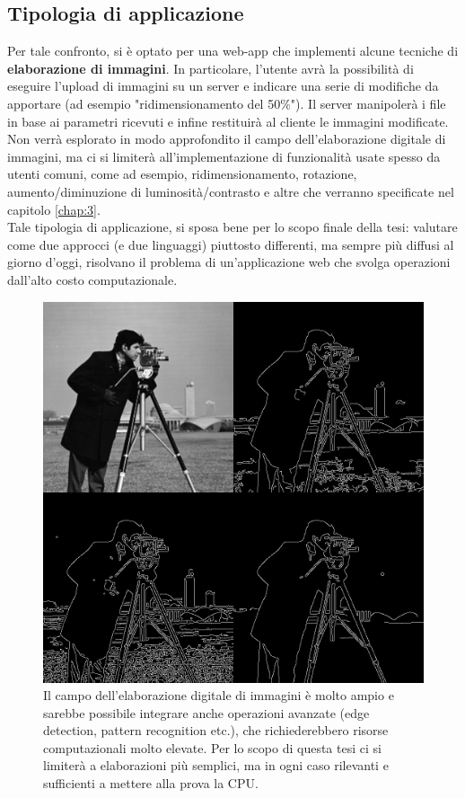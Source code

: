 \subsection{Tipologia di applicazione}
Per tale confronto, si è optato per una web-app che implementi alcune tecniche di \textbf{elaborazione di immagini}.
In particolare, l'utente avrà la possibilità di eseguire l'upload di immagini su un server e indicare una serie di modifiche da apportare (ad esempio "ridimensionamento del 50\%"). Il server manipolerà i file in base ai parametri ricevuti e infine restituirà al cliente le immagini modificate.
\\Non verrà esplorato in modo approfondito il campo dell'elaborazione digitale di immagini, ma ci si limiterà all'implementazione di funzionalità usate spesso da utenti comuni, come ad esempio, ridimensionamento, rotazione, aumento/diminuzione di luminosità/contrasto e altre che verranno specificate nel capitolo \ref{chap:3}.
\\Tale tipologia di applicazione, si sposa bene per lo scopo finale della tesi: valutare come due approcci (e due linguaggi) piuttosto differenti, ma sempre più diffusi al giorno d'oggi, risolvano il problema di un'applicazione web che svolga operazioni dall'alto costo computazionale.
\begin{figure}
        \begin{center}
                \includegraphics[width=0.55\columnwidth]{images/imageProc.jpg}
        \end{center}
        \caption[Image Processing]{Il campo dell'elaborazione digitale di immagini è molto ampio e sarebbe possibile integrare anche operazioni avanzate (edge detection, pattern recognition etc.), che richiederebbero risorse computazionali molto elevate. Per lo scopo di questa tesi ci si limiterà a elaborazioni più semplici, ma in ogni caso rilevanti e sufficienti a mettere alla prova la CPU.}
        \label{fig:imageProc}
\end{figure} 
